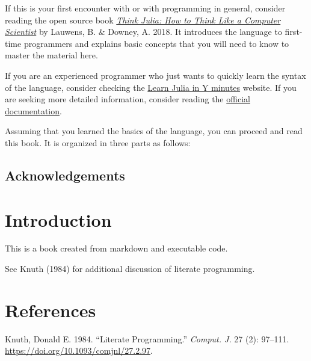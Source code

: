 \documentclass[
  letterpaper,
  DIV=11,
  numbers=noendperiod]{scrreprt}
\newlength{\cslhangindent}
\newlength{\cslentryspacingunit} %
\newenvironment{CSLReferences}[2] %
 {%
  \setlength{\parindent}{0pt}
  \ifodd #1
  \let\oldpar\par
  \def\par{\hangindent=\cslhangindent\oldpar}
  \fi
  \setlength{\parskip}{#2\cslentryspacingunit}
 }%
 {}
\begin{document}

If this is your first encounter with
\href{https://julialang.org}{}
or with programming in general, consider reading the open source book
\href{https://benlauwens.github.io/ThinkJulia.jl/latest/book.html}{\emph{Think
Julia: How to Think Like a Computer Scientist}} by Lauwens, B. \&
Downey, A. 2018. It introduces the language to first-time programmers
and explains basic concepts that you will need to know to master the
material here.

If you are an experienced programmer who just wants to quickly learn the
syntax of the language, consider checking the
\href{https://learnxinyminutes.com/docs/julia}{Learn Julia in Y minutes}
website. If you are seeking more detailed information, consider reading
the \href{https://docs.julialang.org/en/v1}{official documentation}.

Assuming that you learned the basics of the language, you can proceed
and read this book. It is organized in three parts as follows:

\hypertarget{acknowledgements}{%
\section*{Acknowledgements}\label{acknowledgements}}



\hypertarget{introduction}{%
\chapter{Introduction}\label{introduction}}

This is a book created from markdown and executable code.

See Knuth (1984) for additional discussion of literate programming.


\hypertarget{references}{%
\chapter*{References}\label{references}}


\hypertarget{refs}{}
\begin{CSLReferences}{1}{0}
\leavevmode{}%
Knuth, Donald E. 1984. {``Literate Programming.''} \emph{Comput. J.} 27
(2): 97--111. \url{https://doi.org/10.1093/comjnl/27.2.97}.

\end{CSLReferences}
\end{document}
